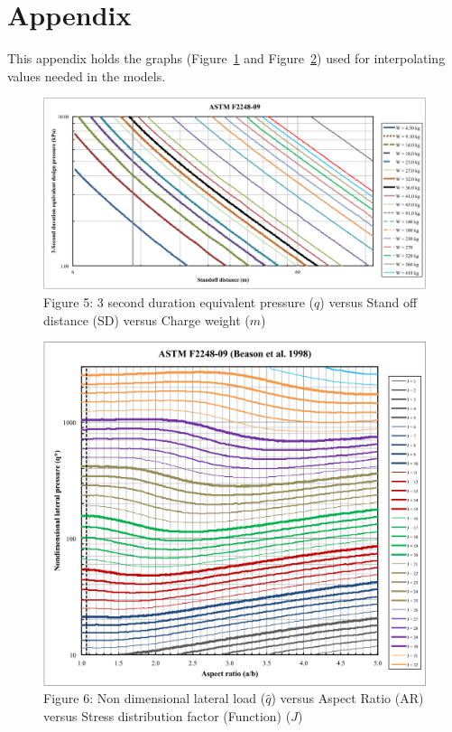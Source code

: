 \documentclass[12pt]{article}
\begin{document}
\section{Appendix}
\label{Sec:Appendix}
This appendix holds the graphs (Figure~\ref{Figure:demandVSsod} and Figure~\ref{Figure:dimlessloadVSaspect}) used for interpolating values needed in the models.
\begin{figure}
\begin{center}
\includegraphics[width=\textwidth]{../../../datafiles/GlassBR/ASTM_F2248-09.png}
\caption{Figure 5: 3 second duration equivalent pressure ($q$) versus Stand off distance (SD) versus Charge weight ($m$)}
\label{Figure:demandVSsod}
\end{center}
\end{figure}
\begin{figure}
\begin{center}
\includegraphics[width=\textwidth]{../../../datafiles/GlassBR/ASTM_F2248-09_BeasonEtAl.png}
\caption{Figure 6: Non dimensional lateral load ($\hat{q}$) versus Aspect Ratio (AR) versus Stress distribution factor (Function) ($J$)}
\label{Figure:dimlessloadVSaspect}
\end{center}
\end{figure}
\end{document}
